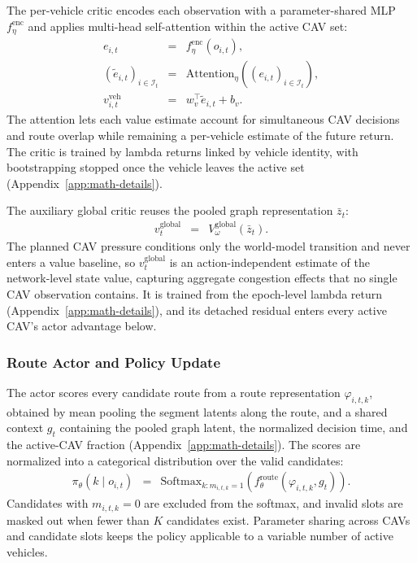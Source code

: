 The per-vehicle critic encodes each observation with a parameter-shared MLP
\(f_\eta^{\mathrm{enc}}\) and applies multi-head self-attention within the
active CAV set:
\begin{equation}
\begin{array}{rcl}
e_{i,t} &=& f_\eta^{\mathrm{enc}}(o_{i,t}),\\
(\widetilde e_{i,t})_{i\in\mathcal{I}_t}
&=&
\mathrm{Attention}_\eta((e_{i,t})_{i\in\mathcal{I}_t}),\\
v_{i,t}^{\mathrm{veh}}
&=&
w_v^\top\widetilde e_{i,t}+b_v.
\end{array}
\end{equation}
The attention lets each value estimate account for simultaneous CAV
decisions and route overlap while remaining a per-vehicle estimate of the
future return.  The critic is trained by lambda returns linked by vehicle
identity, with bootstrapping stopped once the vehicle leaves the active set
(Appendix~\ref{app:math-details}).

The auxiliary global critic reuses the pooled graph representation
\(\bar z_t\):
\begin{equation}
\begin{array}{rcl}
v_t^{\mathrm{global}}
&=&
V_\omega^{\mathrm{global}}
(\bar z_t).
\end{array}
\end{equation}
The planned CAV pressure conditions only the world-model transition and
never enters a value baseline, so \(v_t^{\mathrm{global}}\) is an
action-independent estimate of the network-level state value, capturing
aggregate congestion effects that no single CAV observation contains.  It is
trained from the epoch-level lambda return
(Appendix~\ref{app:math-details}), and its detached residual enters every
active CAV's actor advantage below.

\subsubsection{Route Actor and Policy Update}

The actor scores every candidate route from a route representation
\(\varphi_{i,t,k}\), obtained by mean pooling the segment latents along the
route, and a shared context \(g_t\) containing the pooled graph latent, the
normalized decision time, and the active-CAV fraction
(Appendix~\ref{app:math-details}).  The scores are normalized into a
categorical distribution over the valid candidates:
\begin{equation}
\begin{array}{rcl}
\pi_\theta(k\mid o_{i,t})
&=&
\mathrm{Softmax}_{k:m_{i,t,k}=1}
\!\left(f_\theta^{\mathrm{route}}(\varphi_{i,t,k},g_t)\right).
\end{array}
\end{equation}
Candidates with \(m_{i,t,k}=0\) are excluded from the softmax, and invalid
slots are masked out when fewer than \(K\) candidates exist.  Parameter
sharing across CAVs and candidate slots keeps the policy applicable to a
variable number of active vehicles.

